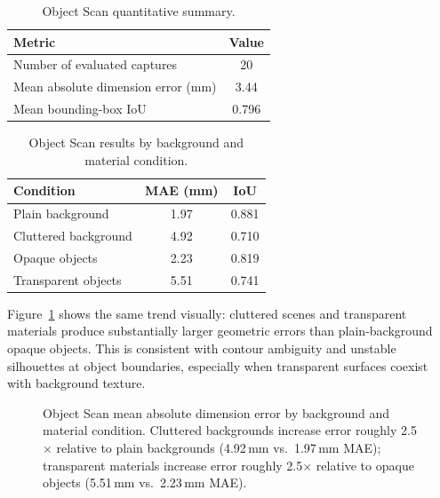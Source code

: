 \begin{table}[htbp]
\centering
\caption{Object Scan quantitative summary.}
\label{tab:object_scan_summary}
\small
\begin{tabular}{|l|c|}
\hline
\textbf{Metric} & \textbf{Value} \\
\hline
Number of evaluated captures & 20 \\
\hline
Mean absolute dimension error (mm) & 3.44 \\
\hline
Mean bounding-box IoU & 0.796 \\
\hline
\end{tabular}
\end{table}

\begin{table}[htbp]
\centering
\caption{Object Scan results by background and material condition.}
\label{tab:object_scan_conditions}
\small
\begin{tabular}{|l|c|c|}
\hline
\textbf{Condition} & \textbf{MAE (mm)} & \textbf{IoU} \\
\hline
Plain background & 1.97 & 0.881 \\
\hline
Cluttered background & 4.92 & 0.710 \\
\hline
Opaque objects & 2.23 & 0.819 \\
\hline
Transparent objects & 5.51 & 0.741 \\
\hline
\end{tabular}
\end{table}

Figure~\ref{fig:object_scan_condition_plot} shows the same trend visually: cluttered scenes and transparent materials produce substantially larger geometric errors than plain-background opaque objects. This is consistent with contour ambiguity and unstable silhouettes at object boundaries, especially when transparent surfaces coexist with background texture.

\begin{figure}[htbp]
\centering
{}
\caption{Object Scan mean absolute dimension error by background and material condition. Cluttered backgrounds increase error roughly 2.5$\times$ relative to plain backgrounds (4.92\,mm vs.\ 1.97\,mm MAE); transparent materials increase error roughly 2.5$\times$ relative to opaque objects (5.51\,mm vs.\ 2.23\,mm MAE).}
\label{fig:object_scan_condition_plot}
\end{figure}

